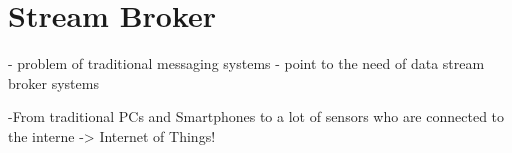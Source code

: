 \section{Stream Broker}


- problem of traditional messaging systems
- point to the need of data stream broker systems


-From traditional PCs and Smartphones to a lot of sensors who are connected to
the interne -> Internet of Things!



